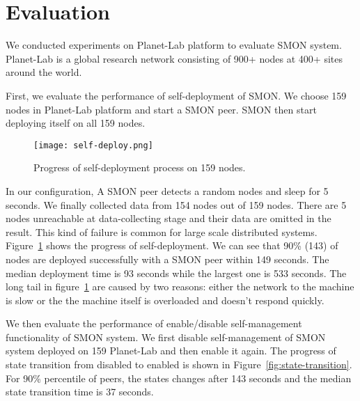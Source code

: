 \section{Evaluation}
\label{sec:eval}

We conducted experiments on Planet-Lab platform to evaluate
SMON system. Planet-Lab is a global research network
consisting of 900+ nodes at 400+ sites around the
world.

%

First, we evaluate the performance of self-deployment of
SMON.  We choose 159 nodes in Planet-Lab platform and start
a SMON peer. SMON then start deploying itself on all 159
nodes.

\begin{figure}
\centering
\texttt{[image: self-deploy.png]}
\caption{Progress of self-deployment process on 159
nodes.}
\label{fig:self-deploy}
\end{figure}

In our configuration, A SMON peer detects a random nodes and
sleep for 5 seconds. We finally collected data from 154
nodes out of 159 nodes. There are 5 nodes unreachable at
data-collecting stage and their data are omitted in the
result. This kind of failure is common for large scale
distributed systems.  Figure~\ref{fig:self-deploy} shows the
progress of self-deployment. We can see that 90\% (143) of
nodes are deployed successfully with a SMON peer within 149
seconds. The median deployment time is 93 seconds while the
largest one is 533 seconds. The long tail in
figure~\ref{fig:self-deploy} are caused by two reasons:
either the network to the machine is slow or the the machine
itself is overloaded and doesn't respond quickly.

We then evaluate the performance of enable/disable
self-management functionality of SMON system. We first
disable self-management of SMON system deployed on 159
Planet-Lab and then enable it again. The progress of state
transition from disabled to enabled is shown in
Figure~\ref{fig:state-transition}. For 90\%
percentile of peers, the states changes after 143
seconds and the median state transition time is 37 seconds.

